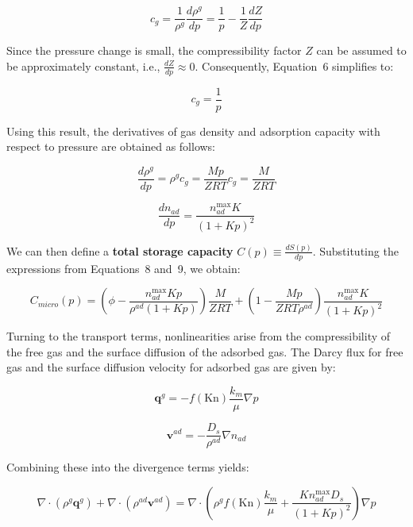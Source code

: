 \documentclass{article}
\begin{document}
\begin{equation}
    c_{g}=\frac{1}{\rho^{g}} \frac{d \rho^{g}}{d p}=\frac{1}{p}-\frac{1}{Z} \frac{d Z}{d p}
\end{equation}

Since the pressure change is small, the compressibility factor $Z$ can be assumed to be approximately constant, i.e., $\frac{dZ}{dp} \approx 0$. Consequently, Equation~6 simplifies to:

\begin{equation}
    c_{g}=\frac{1}{p}
\end{equation}

Using this result, the derivatives of gas density and adsorption capacity with respect to pressure are obtained as follows:

\begin{equation}
    \frac{d \rho^{g}}{d p}=\rho^{g} c_{g}=\frac{M p}{Z R T} c_{g}=\frac{M}{Z R T}
\end{equation}

\begin{equation}
    \frac{d n_{ad}}{d p}=\frac{n_{ad}^{\max} K}{(1+K p)^{2}}
\end{equation}

We can then define a \textbf{total storage capacity} $C(p) \equiv \frac{dS(p)}{dp}$. Substituting the expressions from Equations~8 and~9, we obtain:

\begin{equation}
    C_{micro}(p)=\left(\phi-\frac{n_{ad}^{\max} K p}{\rho^{ad}(1+K p)}\right) \frac{M}{Z R T}+\left(1-\frac{M p}{Z R T \rho^{ad}}\right) \frac{n_{ad}^{\max} K}{(1+K p)^{2}}
\end{equation}

Turning to the transport terms, nonlinearities arise from the compressibility of the free gas and the surface diffusion of the adsorbed gas. The Darcy flux for free gas and the surface diffusion velocity for adsorbed gas are given by:

\begin{equation}
    \mathbf{q}^{g}=-f(\mathrm{Kn}) \frac{k_{m}}{\mu} \nabla p
\end{equation}

\begin{equation}
    \mathbf{v}^{ad}=-\frac{D_{s}}{\rho^{ad}} \nabla n_{ad}
\end{equation}

Combining these into the divergence terms yields:

\begin{equation}
    \nabla \cdot\left(\rho^{g} \mathbf{q}^{g}\right)+\nabla \cdot\left(\rho^{ad} \mathbf{v}^{ad}\right)=\nabla \cdot\left(\rho^{g} f(\mathrm{Kn}) \frac{k_{m}}{\mu}+\frac{K n_{ad}^{\max} D_{s}}{(1+K p)^{2}}\right) \nabla p
\end{equation}
\end{document}
